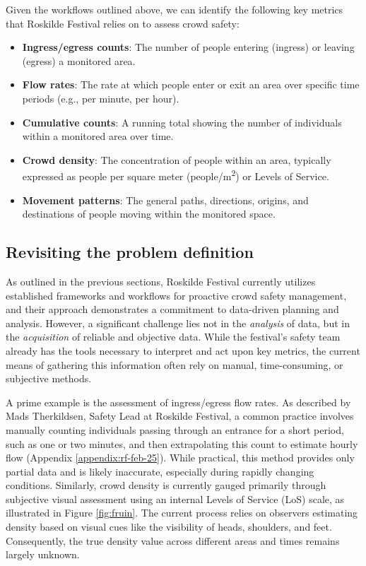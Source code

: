 Given the workflows outlined above, we can identify the following key metrics that Roskilde Festival relies on to assess crowd safety:

\begin{itemize}
  \item \textbf{Ingress/egress counts}: The number of people entering (ingress) or leaving (egress) a monitored area.
  \item \textbf{Flow rates}: The rate at which people enter or exit an area over specific time periods (e.g., per minute, per hour).
  \item \textbf{Cumulative counts}: A running total showing the number of individuals within a monitored area over time.
  \item \textbf{Crowd density}: The concentration of people within an area, typically expressed as people per square meter (people/m\textsuperscript{2}) or Levels of Service.
  \item \textbf{Movement patterns}: The general paths, directions, origins, and destinations of people moving within the monitored space.
\end{itemize}

\subsection{Revisiting the problem definition}
As outlined in the previous sections, Roskilde Festival currently utilizes established frameworks and workflows for proactive crowd safety management, and their approach demonstrates a commitment to data-driven planning and analysis. However, a significant challenge lies not in the \textit{analysis} of data, but in the \textit{acquisition} of reliable and objective data. While the festival's safety team already has the tools necessary to interpret and act upon key metrics, the current means of gathering this information often rely on manual, time-consuming, or subjective methods.

A prime example is the assessment of ingress/egress flow rates. As described by Mads Therkildsen, Safety Lead at Roskilde Festival, a common practice involves manually counting individuals passing through an entrance for a short period, such as one or two minutes, and then extrapolating this count to estimate hourly flow (Appendix \ref{appendix:rf-feb-25}). While practical, this method provides only partial data and is likely inaccurate, especially during rapidly changing conditions. Similarly, crowd density is currently gauged primarily through subjective visual assessment using an internal Levels of Service (LoS) scale, as illustrated in Figure \ref{fig:fruin}. The current process relies on observers estimating density based on visual cues like the visibility of heads, shoulders, and feet. Consequently, the true density value across different areas and times remains largely unknown.

